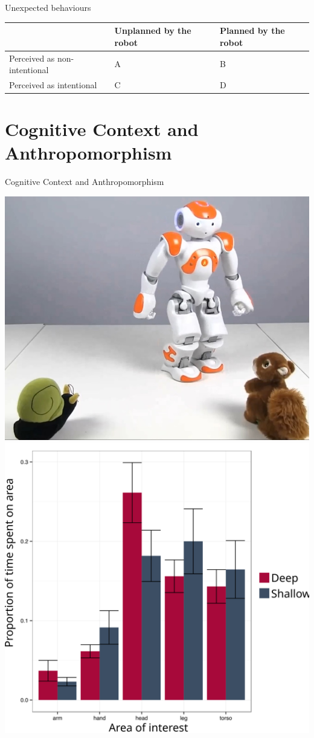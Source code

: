 \documentclass[compress]{beamer}
\begin{document}

\begin{frame}{Unexpected behaviours}

    \centering
    \begin{tabular}{  >{\centering\arraybackslash}m{2cm} | >{\centering\arraybackslash}m{2cm} | >{\centering\arraybackslash}m{2cm} }
        & Unplanned by the robot & Planned by the robot \\ \hline
        Perceived as non-intentional & A  & B  \\ \hline
        Perceived as intentional &  C & D 
    \end{tabular}


\end{frame}


\section{Cognitive Context and Anthropomorphism}


{
\begin{frame}{Cognitive Context and Anthropomorphism}
    \begin{center}
        \includegraphics[width=0.45\linewidth]{stimulus-toys}
        \hspace*{1cm}
        \includegraphics[width=0.45\linewidth]{cognitive-priming}
    \end{center}
\end{frame}
}
\end{document}
